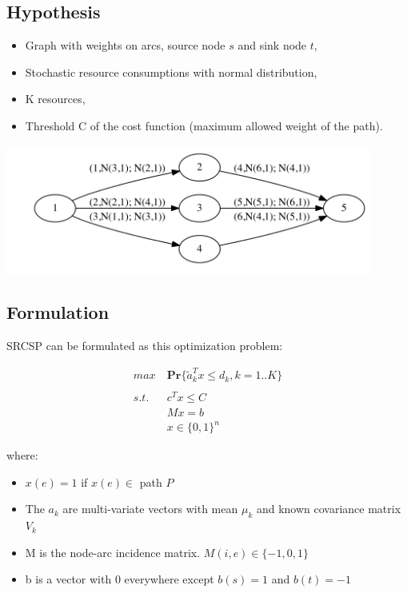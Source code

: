 \documentclass{beamer}
\begin{document}
\subsection{Hypothesis}
\begin{frame}
	\begin{itemize}
		\item Graph with weights on arcs, source node $s$ and sink node $t$,
		\item Stochastic resource consumptions with normal distribution,
		\item K resources,
		\item Threshold C of the cost function (maximum allowed weight of the path).
	\end{itemize}
	\pause
	\hspace*{-1.5cm}
	\includegraphics[width=12cm]{media/SRCSP_2.png}
\end{frame}

\subsection{Formulation}
\begin{frame}

SRCSP can be formulated as this optimization problem:

\begin{align*}
 max\ &\mathbf{Pr} \{ \tilde{a}_k^Tx \leq d_k, k=1..K \} \\ \\
 s.t.\ &c^T x \leq C \\
 &Mx = b \\
 &x \in \{0, 1\}^n
\end{align*}

where:

\begin{itemize}
	\item $x(e) = 1$ if $x(e) \in $ path $P$
	\item The $a_k$ are multi-variate vectors with mean $\mu_k$ and known covariance matrix $V_k$
	\item M is the node-arc incidence matrix. $M(i, e) \in \{-1, 0, 1\}$
	\item b is a vector with 0 everywhere except $b(s) = 1$ and $b(t) = -1$
\end{itemize}

\end{frame}
\end{document}
